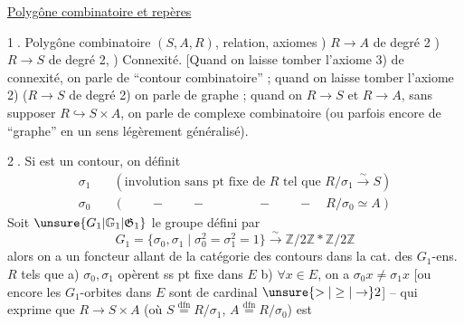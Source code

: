 \uline{Polygône combinatoire et repères}

\textcircled{\small 1.} Polygône combinatoire $(S,A,R)$,
relation, axiomes ) $R\to A$ de degré 2 ) $R\to S$ de
degré 2, ) Connexité. [Quand on laisse tomber
l'axiome 3) de connexité, on parle de ``contour
combinatoire'' ; quand on laisse tomber  l'axiome 2)
($R\to S$ de degré 2) on parle de graphe ; quand
on   $R\to S$ et $R\to A$, sans supposer $R\hookrightarrow S\times A$,
on parle de  complexe  
combinatoire (ou parfois encore de ``graphe'' en
un sens légèrement généralisé).

\textcircled{\small 2.} Si
est un contour, on définit
\[
\begin{aligned}
\sigma_1&\quad(\text{involution sans pt fixe de }R\text{ tel que }R/\sigma_1\xrightarrow{\sim}S)\\
\sigma_0&\quad(\qquad-\qquad-\qquad\qquad-\qquad-\quad R/\sigma_0\simeq A)
\end{aligned}
\]
Soit $\unsure{G_1|\mathbb G_1|\mathfrak G_1}$ le groupe défini par
\[
G_1=\{\sigma_0,\sigma_1\mid\sigma_0^2=\sigma_1^2=1\}\xrightarrow{\sim}\mathbb Z/2\mathbb Z*\mathbb Z/2\mathbb Z
\]
alors on a un foncteur allant de la
catégorie des contours dans la cat. des $G_1$-ens.
$R$ tels que \quad a) $\sigma_0,\sigma_1$ opèrent ss pt fixe dans $E$
b) $\forall x\in E$, on a $\sigma_0x\ne\sigma_1x$ [ou encore les $G_1$-orbites
dans $E$ sont de cardinal $\unsure{>|\geq|\to}2$] -- qui exprime
que $R\to S\times A$ (où $S\overset{\mathrm{dfn}}=R/\sigma_1$, $A\overset{\mathrm{dfn}}=R/\sigma_0$) est
